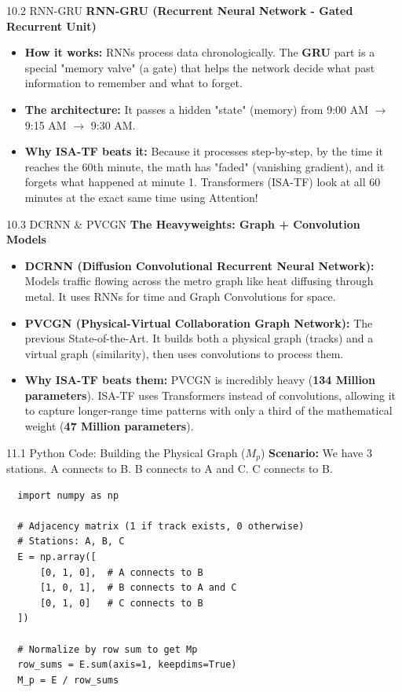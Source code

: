 \documentclass[aspectratio=169]{beamer}
\begin{document}
\begin{frame}{10.2 RNN-GRU}
    \textbf{RNN-GRU (Recurrent Neural Network - Gated Recurrent Unit)}
    \begin{itemize}
        \item \textbf{How it works:} RNNs process data chronologically. The \textbf{GRU} part is a special "memory valve" (a gate) that helps the network decide what past information to remember and what to forget.
        \item \textbf{The architecture:} It passes a hidden "state" (memory) from 9:00 AM $\rightarrow$ 9:15 AM $\rightarrow$ 9:30 AM.
        \item \textbf{Why ISA-TF beats it:} Because it processes step-by-step, by the time it reaches the 60th minute, the math has "faded" (vanishing gradient), and it forgets what happened at minute 1. Transformers (ISA-TF) look at all 60 minutes at the exact same time using Attention!
    \end{itemize}
\end{frame}

\begin{frame}{10.3 DCRNN \& PVCGN}
    \textbf{The Heavyweights: Graph + Convolution Models}
    \begin{itemize}
        \item \textbf{DCRNN (Diffusion Convolutional Recurrent Neural Network):} Models traffic flowing across the metro graph like heat diffusing through metal. It uses RNNs for time and Graph Convolutions for space.
        \item \textbf{PVCGN (Physical-Virtual Collaboration Graph Network):} The previous State-of-the-Art. It builds both a physical graph (tracks) and a virtual graph (similarity), then uses convolutions to process them.
        \item \textbf{Why ISA-TF beats them:} PVCGN is incredibly heavy (\textbf{134 Million parameters}). ISA-TF uses Transformers instead of convolutions, allowing it to capture longer-range time patterns with only a third of the mathematical weight (\textbf{47 Million parameters}).
    \end{itemize}
\end{frame}





\begin{frame}[fragile]{11.1 Python Code: Building the Physical Graph ($M_p$)}
  \textbf{Scenario:} We have 3 stations. A connects to B. B connects to A and C. C connects to B.
  \begin{verbatim}
  import numpy as np

  # Adjacency matrix (1 if track exists, 0 otherwise)
  # Stations: A, B, C
  E = np.array([
      [0, 1, 0],  # A connects to B
      [1, 0, 1],  # B connects to A and C
      [0, 1, 0]   # C connects to B
  ])

  # Normalize by row sum to get Mp
  row_sums = E.sum(axis=1, keepdims=True)
  M_p = E / row_sums
  \end{verbatim}
\end{frame}
\end{document}

